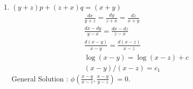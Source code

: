 \begin{enumerate}
\begin{align*}
			& \frac{dx-dy}{(x-y)(x+y+z)} = \frac{dy-dz}{(y-z)(y+z+x)}\\
			& \frac{d(x-y)}{x-y} = \frac{d(y-z)}{y-z} \\
			& \log (x-y) - \log (y-z) + c\\
			& (x-y)/(y-z) = c_1
			\intertext{Similarly,}
			& (x-z)/(y-z) = c_2
		\end{align*}
		General Solution : $\phi\left(\frac{x-y}{y-z},\frac{x-z}{y-z}\right) = 0$.
	\item $(y+z)p + (z+x)q = (x+y)$
		\begin{align*}
			& \frac{dx}{y+z} = \frac{dy}{z+x} = \frac{dz}{x+y} \\
			& \frac{dx-dy}{y-x} = \frac{dx-dz}{z-x} \\
			& \frac{d(x-y)}{x-y} = \frac{d(x-z)}{x-z} \\
			& \log (x-y) = \log (x-z) + c \\
			& (x-y)/(x-z) = c_1
		\end{align*}
		General Solution : $\phi\left(\frac{x-y}{x-z}, \frac{x-y}{y-z}\right) = 0$.
\end{enumerate}
